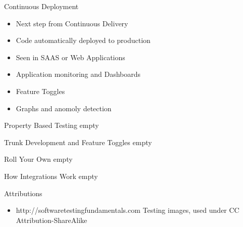 \documentclass{beamer}
\begin{document}
\begin{frame}{Continuous Deployment}
	\begin{itemize}
		\item Next step from Continuous Delivery
		\item Code automatically deployed to production
		\item Seen in SAAS or Web Applications
		\item Application monitoring and Dashboards
		\item Feature Toggles
		\item Graphs and anomoly detection
	\end{itemize}
\end{frame}

\begin{frame}{Property Based Testing}
	empty
\end{frame}

\begin{frame}{Trunk Development and Feature Toggles}
	empty
\end{frame}

\begin{frame}{Roll Your Own}
	empty
\end{frame}

\begin{frame}{How Integrations Work}
	empty
\end{frame}

\begin{frame}{Attributions}
	\begin{itemize}
		\item http://softwaretestingfundamentals.com Testing images, used under CC Attribution-ShareAlike
	\end{itemize}
\end{frame}
\end{document}
